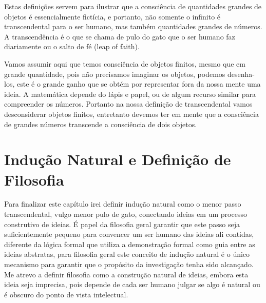 \documentclass[10pt,a4paper]{report}
\begin{document}
\hspace{\baselineskip}

Estas definições servem para ilustrar que a consciência de quantidades grandes de objetos é essencialmente fictícia, e portanto, não somente o infinito é transcendental para o ser humano, mas também quantidades grandes de números. A transcendência é o que se chama de pulo do gato que o ser humano faz diariamente ou o salto de fé (leap of faith). 

\hspace{\baselineskip}

Vamos assumir aqui que temos consciência de objetos finitos, mesmo que em grande quantidade, pois não precisamos imaginar os objetos, podemos desenha-los, este é o grande ganho que se obtém por representar fora da nossa mente uma ideia. A matemática depende do lápis e papel, ou de algum recurso similar para compreender os números. Portanto na nossa definição de transcendental vamos desconsiderar objetos finitos, entretanto devemos ter em mente que a consciência de grandes números transcende a consciência de dois objetos.


\section{Indução Natural e Definição de Filosofia} 

% 
\hspace{\baselineskip}

Para finalizar este capítulo irei definir indução natural como o menor passo transcendental, vulgo menor pulo de gato, conectando ideias em um processo construtivo de ideias. É papel da filosofia geral garantir que este passo seja suficientemente pequeno para convencer um ser humano das ideias ali contidas, diferente da lógica formal que utiliza a demonstração formal como guia entre as ideias abstratas, para filosofia geral este conceito de indução natural é o único mecanismo para garantir que o propósito da investigação tenha sido alcançado. Me atrevo a definir filosofia como a construção natural de ideias, embora esta ideia seja imprecisa, pois depende de cada ser humano julgar se algo é natural ou é obscuro do ponto de vista intelectual.\\
\end{document}
